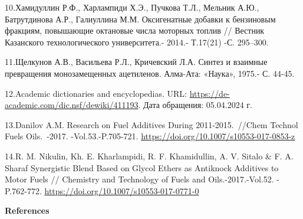 \begin{references}
10.Хамидуллин Р.Ф., Харлампиди Х.Э., Пучкова Т.Л., Мельник А.Ю.,
Батрутдинова А.Р., Галиуллина М.М. Оксигенатные добавки к бензиновым
фракциям, повышающие октановые числа моторных топлив // Вестник
Казанского технологического университета.- 2014.- Т.17(21) -С. 295--300.

11.Щелкунов А.В., Васильева Р.Л., Кричевский Л.А. Синтез и взаимные
превращения монозамещенных ацетиленов. Алма-Ата: «Наука», 1975.- С.
44-45.

12.Academic dictionaries and encyclopedias. URL:
\url{https://de-academic.com/dic.nsf/dewiki/411193}. Дата обращения:
05.04.2024 г.

13.Danilov A.M. Research on Fuel Additives During 2011-2015.~//Chem
Technol Fuels Oils.~-2017. -Vol.53.-P.705-721.
\url{https://doi.org/10.1007/s10553-017-0853-z}

14.R. M. Nikulin, Kh. E. Kharlampidi, R. F. Khamidullin, A. V. Sitalo \&
F. A. Sharaf Synergistic Blend Based on Glycol Ethers as Antiknock
Additives to Motor Fuels // Chemistry and Technology of Fuels and
Oils.-2017.-Vol.52. - P.762-772.
\url{https://doi.org/10.1007/s10553-017-0771-0}
\end{references}

\begin{center}
{\bfseries References}
\end{center}

